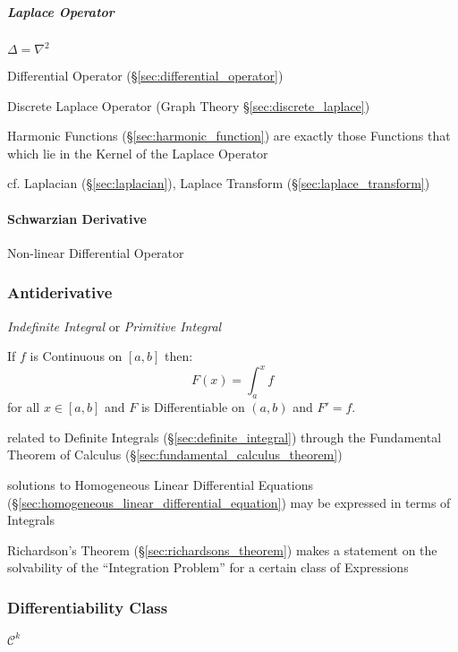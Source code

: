 \subparagraph{Laplace Operator}\label{sec:laplace_operator}\hfill

$\Delta = \nabla^2$

Differential Operator (\S\ref{sec:differential_operator})

Discrete Laplace Operator (Graph Theory \S\ref{sec:discrete_laplace})

Harmonic Functions (\S\ref{sec:harmonic_function}) are exactly those Functions
that which lie in the Kernel of the Laplace Operator

\fist cf. Laplacian (\S\ref{sec:laplacian}), Laplace Transform
(\S\ref{sec:laplace_transform})



\paragraph{Schwarzian Derivative}\label{sec:schwarzian_derivative}\hfill

Non-linear Differential Operator



\subsubsection{Antiderivative}\label{sec:antiderivative}

\emph{Indefinite Integral} or \emph{Primitive Integral}

If $f$ is Continuous on $[a,b]$ then:
\[
  F(x) = \int_a^x f
\]
for all $x \in [a,b]$ and $F$ is Differentiable on $(a,b)$ and $F' = f$.

\fist related to Definite Integrals (\S\ref{sec:definite_integral}) through the
Fundamental Theorem of Calculus (\S\ref{sec:fundamental_calculus_theorem})

solutions to Homogeneous Linear Differential Equations
(\S\ref{sec:homogeneous_linear_differential_equation}) may be expressed in
terms of Integrals

Richardson's Theorem (\S\ref{sec:richardsons_theorem}) makes a statement on the
solvability of the ``Integration Problem'' for a certain class of Expressions



\subsubsection{Differentiability Class}\label{sec:differentiability_class}

$\mathcal{C}^k$

